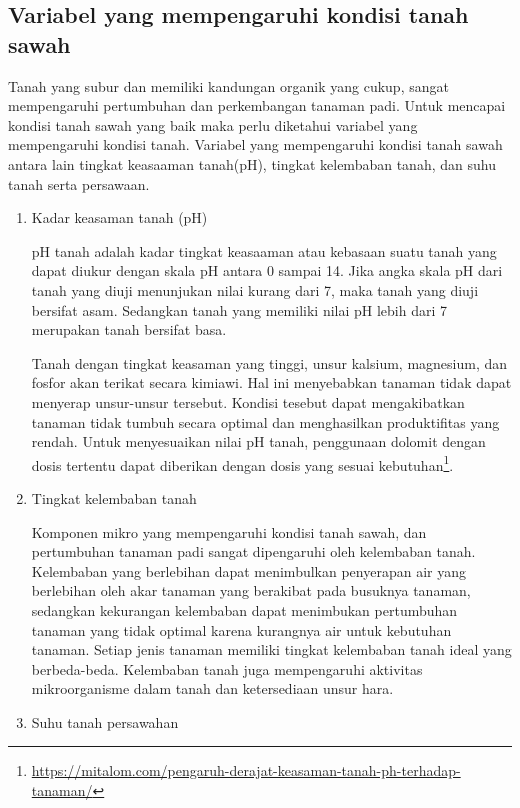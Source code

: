 \subsection{Variabel yang mempengaruhi kondisi tanah sawah}
Tanah yang subur dan memiliki kandungan organik yang cukup, sangat mempengaruhi pertumbuhan dan perkembangan tanaman padi. Untuk mencapai kondisi tanah sawah yang baik maka perlu diketahui variabel yang mempengaruhi kondisi tanah. Variabel yang mempengaruhi kondisi tanah sawah antara lain tingkat keasaaman tanah(pH), tingkat kelembaban tanah, dan suhu tanah serta persawaan.

\begin{enumerate}

    \item{Kadar keasaman tanah (pH)}
    
    pH tanah adalah kadar tingkat keasaaman atau kebasaan suatu tanah yang dapat diukur dengan skala pH antara 0 sampai 14. Jika angka skala pH dari tanah yang diuji menunjukan nilai kurang dari 7, maka tanah yang diuji bersifat asam. Sedangkan tanah yang memiliki nilai pH lebih dari 7 merupakan tanah bersifat basa.
    
    Tanah dengan tingkat keasaman yang tinggi, unsur kalsium, magnesium, dan fosfor akan terikat secara kimiawi. Hal ini menyebabkan tanaman tidak dapat menyerap unsur-unsur tersebut. Kondisi tesebut dapat mengakibatkan tanaman tidak tumbuh secara optimal dan menghasilkan produktifitas yang rendah. Untuk menyesuaikan nilai pH tanah, penggunaan dolomit dengan dosis tertentu dapat diberikan dengan dosis yang sesuai kebutuhan\footnote{\url{https://mitalom.com/pengaruh-derajat-keasaman-tanah-ph-terhadap-tanaman/}}\cite{dariska:01:phtanah}.
    
    
    \item{Tingkat kelembaban tanah}
    
    Komponen mikro yang mempengaruhi kondisi tanah sawah, dan pertumbuhan tanaman padi sangat dipengaruhi oleh kelembaban tanah. Kelembaban yang berlebihan dapat menimbulkan penyerapan air yang berlebihan oleh akar tanaman yang berakibat pada busuknya tanaman, sedangkan kekurangan kelembaban dapat menimbukan pertumbuhan tanaman yang tidak optimal karena kurangnya air untuk kebutuhan tanaman. Setiap jenis tanaman memiliki tingkat kelembaban tanah ideal yang berbeda-beda. Kelembaban tanah juga mempengaruhi aktivitas mikroorganisme dalam tanah dan ketersediaan unsur hara\cite{chusnul:01:kelembabantanah}.
     
    \item{Suhu tanah persawahan}
    

\end{enumerate}
